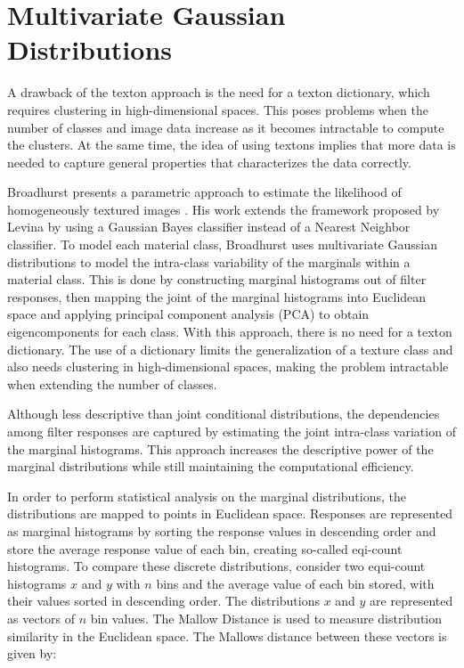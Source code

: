 \section{Multivariate Gaussian Distributions}\label{sec:MGD}
A drawback of the texton approach is the need for a texton dictionary, which requires clustering in high-dimensional spaces. This poses problems when the number of classes and image data increase as it becomes intractable to compute the clusters. At the same time, the idea of using textons implies that more data is needed to capture general properties that characterizes the data correctly.

Broadhurst presents a parametric approach to estimate the likelihood of homogeneously textured images \cite{Broadhurst}. His work extends the framework proposed by Levina \cite{Levina} by using a Gaussian Bayes classifier instead of a Nearest Neighbor classifier. To model each material class, Broadhurst uses multivariate Gaussian distributions to model the intra-class variability of the marginals within a material class. This is done by constructing marginal histograms out of filter responses, then mapping the joint of the marginal histograms into Euclidean space and applying principal component analysis (PCA) to obtain eigencomponents for each class. With this approach, there is no need for a texton dictionary. The use of a dictionary limits the generalization of a texture class and also needs clustering in high-dimensional spaces, making the problem intractable when extending the number of classes. 

Although less descriptive than joint conditional distributions, the dependencies among filter responses are captured by estimating the joint intra-class variation of the marginal histograms. This approach increases the descriptive power of the marginal distributions while still maintaining the computational efficiency. 

In order to perform statistical analysis on the marginal distributions, the distributions are mapped to points in Euclidean space. Responses are represented as marginal histograms by sorting the response values in descending order and store the average response value of each bin, creating so-called eqi-count histograms. To compare these discrete distributions, consider two equi-count histograms $x$ and $y$ with $n$ bins and the average value of each bin stored, with their values sorted in descending order. The distributions $x$ and $y$ are represented as vectors of $n$ bin values. The Mallow Distance is used to measure distribution similarity in the Euclidean space. The Mallows distance between these vectors is given by:

